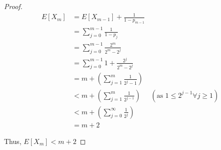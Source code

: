 \documentclass{article}
\begin{document}
\begin{proof}
\begin{align*}
    E[X_m] &= E[X_{m-1}] + \frac{1}{1-p_{m-1}} \\
    &= \sum_{j=0}^{m-1} \frac{1}{1-p_j} \\
    &= \sum_{j=0}^{m-1} \frac{2^m}{2^m - 2^j} \\
    &= \sum_{j=0}^{m-1} 1 + \frac{2^j}{2^m - 2^j} \\
    &= m + \left(\sum_{j=1}^{m} \frac{1}{2^j - 1 }\right) \\
    &< m + \left(\sum_{j=1}^{m} \frac{1}{2^{j-1} }\right) & (\text{as } 1 \leq 2^{j-1} \forall j \geq 1) \\ 
    &< m + \left(\sum_{j=0}^{\infty} \frac{1}{2^{j} }\right) \\
    &= m + 2
\end{align*}

Thus, $E[X_m] < m+2$
\end{proof}
\end{document}
